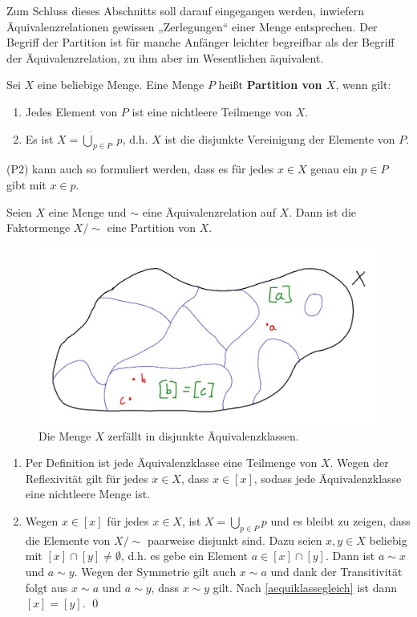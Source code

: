 Zum Schluss dieses Abschnitts soll darauf eingegangen werden, inwiefern Äquivalenzrelationen gewissen „Zerlegungen“ einer Menge entsprechen. Der Begriff der Partition ist für manche Anfänger leichter begreifbar als der Begriff der Äquivalenzrelation, zu ihm aber im Wesentlichen äquivalent.


\begin{defin}[Partition] 
    Sei $X$ eine beliebige Menge. Eine Menge $P$ heißt \textbf{Partition von $X$}, wenn gilt:
    \begin{enumerate}[label=(P\arabic*), labelindent=1.5em, leftmargin=*]
        \item Jedes Element von $P$ ist eine nichtleere Teilmenge von $X$.
        \item Es ist $X=\dot{\bigcup}_{p\in P}\ p$, d.h. $X$ ist die disjunkte Vereinigung der Elemente von $P$.
    \end{enumerate}
    (P2) kann auch so formuliert werden, dass es für jedes $x\in X$ genau ein $p\in P$ gibt mit $x\in p$. 
\end{defin}


\begin{satz} \label{aequirelvspart}
    Seien $X$ eine Menge und $\sim$ eine Äquivalenzrelation auf $X$. Dann ist die Faktormenge $X/{\sim}$ eine Partition von $X$.
    \begin{figure}[ht]
        \includegraphics[width=12cm]{./_img/equivalence.jpeg}
        \centering \caption{Die Menge $X$ zerfällt in disjunkte Äquivalenzklassen.}
    \end{figure}
\end{satz}


\begin{bew}
\begin{enumerate}[(P1)]
    \item Per Definition ist jede Äquivalenzklasse eine Teilmenge von $X$. Wegen der Reflexivität gilt für jedes $x\in X$, dass $x\in[x]$, sodass jede Äquivalenzklasse eine nichtleere Menge ist.
    \item Wegen $x\in [x]$ für jedes $x\in X$, ist $X=\bigcup_{p\in P} p$ und es bleibt zu zeigen, dass die Elemente von $X/{\sim}$ paarweise disjunkt sind. Dazu seien $x,y\in X$ beliebig mit $[x]\cap [y]\neq \emptyset$, d.h. es gebe ein Element $a\in [x]\cap [y]$. Dann ist $a\sim x$ und $a\sim y$. Wegen der Symmetrie gilt auch $x\sim a$ und dank der Transitivität folgt aus $x\sim a$ und $a\sim y$, dass $x\sim y$ gilt. Nach \cref{aequiklassegleich} ist dann $[x]=[y]$. \qed
\end{enumerate}
\end{bew}


